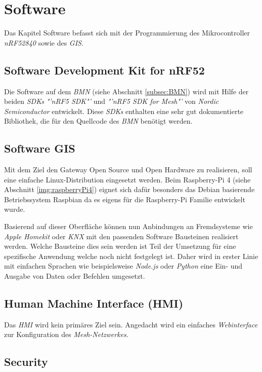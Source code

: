 \clearpage
\section{Software}\label{sec:Software}
Das Kapitel Software befasst sich mit der Programmierung des Mikrocontroller \textit{nRF52840} sowie des \textit{GIS}.

\subsection{Software Development Kit for nRF52}\label{subsec:SDK}
Die Software auf dem \textit{BMN} (siehe Abschnitt \ref{subsec:BMN})  wird mit Hilfe der beiden \textit{SDKs} \textit{"'nRF5 SDK"'}\cite{nordic_semiconductor_nrf5_2019} und \textit{"'nRF5 SDK for Mesh"'}\cite{nordic_semiconductor_nrf5_2019-1} von \textit{Nordic Semiconductor} entwickelt. Diese \textit{SDKs} enthalten eine sehr gut dokumentierte Bibliothek, die für den Quellcode des \textit{BMN} benötigt werden.


\subsection{Software GIS}\label{subsec:SoftwareGIS}
Mit dem Ziel den Gateway Open Source und Open Hardware zu realisieren, soll eine einfache Linux-Distribution eingesetzt werden. Beim Raspberry-Pi 4 (siehe Abschnitt \ref{img:raspberryPi4}) eignet sich dafür besonders das Debian basierende Betriebssystem Raspbian da es eigens für die Raspberry-Pi Familie entwickelt wurde.

Basierend auf dieser Oberfläche können nun Anbindungen an Fremdsysteme wie \textit{Apple Homekit} oder \textit{KNX} mit den passenden Software Bausteinen realisiert werden. Welche Bausteine dies sein werden ist Teil der Umsetzung für eine spezifische Anwendung welche noch nicht festgelegt ist. Daher wird in erster Linie mit einfachen Sprachen wie beispielsweise \textit{Node.js} oder \textit{Python} eine Ein- und Ausgabe von Daten oder Befehlen umgesetzt. 

\subsection{Human Machine Interface (HMI)}\label{subsec:HMI_SW}
Das \textit{HMI} wird kein primäres Ziel sein. Angedacht wird ein einfaches \textit{Webinterface} zur Konfiguration des \textit{Mesh-Netzwerkes}.

\subsection{Security}\label{subsec:Security}

